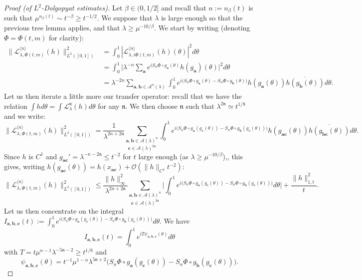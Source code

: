 \documentclass[10pt,a4paper]{amsart}
\begin{document}
\begin{proof}[Proof (of $L^2$-Dolgopyat estimates)]
Let $\beta \in (0,1/2]$ and recall that $n := n_\beta(t)$ is such that $\mu^{n_\beta(t)} \sim t^{-\beta} \geq t^{-1/2}$. We suppose that $\lambda$ is large enough so that the previous tree lemma applies, and that $\lambda \geq \mu^{-10/\beta}.$ We start by writing (denoting $\Phi = \Phi(t,m)$ for clarity):
\begin{align*} 
\Big\| \mathcal{L}_{\lambda,\Phi(t,m)}^{\langle n \rangle}(h) \Big\|_{L^2([0,1])}^2 &= \int_0^1 |\mathcal{L}_{\lambda,i\Phi(t,m)}^{\langle n \rangle}(h)(\theta)|^2 d\theta \\
& = \int_0^1 \Big| \lambda^{-n} \sum_{\mathbf{a}} e^{i S_n \Phi \circ g_{\mathbf{a}}(\theta)} h(g_\mathbf{a})(\theta) \Big|^2 d\theta \\
& = \lambda^{-2n} \sum_{\mathbf{a},\mathbf{b} \in \mathcal{A}^n(\lambda)} \int_0^1 e^{i \big( S_n \Phi \circ g_\mathbf{a}(\theta) - S_n \Phi \circ g_\mathbf{b}(\theta) \big)} h(g_\mathbf{a}(\theta)) \overline{h(g_\mathbf{b}(\theta))} d\theta.
\end{align*}
Let us then iterate a little more our transfer operator: recall that we have the relation $\int h d\theta = \int \mathcal{L}_\lambda^{\mathfrak{n}}(h) d\theta$ for any $\mathfrak{n}$. We then choose $\mathfrak{n}$ such that $\lambda^{2\mathfrak{n}} \simeq t^{1/8}$ and we write:
$$ \Big\| \mathcal{L}_{\lambda,\Phi(t,m)}^{\langle n \rangle}(h) \Big\|_{L^2([0,1])}^2 = \frac{1}{\lambda^{2n+2 \mathfrak{n}}} \underset{\mathbf{c} \in \mathcal{A}(\lambda)^{2\mathfrak{n}}}{\sum_{\mathbf{a},\mathbf{b} \in \mathcal{A}(\lambda)^n}} \int_0^1 e^{i \big( S_n \Phi \circ g_\mathbf{a}(g_\mathbf{c}(\theta)) - S_n \Phi \circ g_\mathbf{b}(g_\mathbf{c}(\theta)) \big)} h(g_\mathbf{ac}(\theta)) \overline{h(g_\mathbf{bc}(\theta))} d\theta. $$
Since $h$ is $C^1$ and $g_{\mathbf{ac}}' = \lambda^{-n-2\mathfrak{n}} \leq t^{-2}$ for $t$ large enough (as $\lambda \geq \mu^{-10/\beta}$),, this gives, writing $h(g_{\mathbf{ac}}(\theta)) = h(x_{\mathbf{ac}})+\mathcal{O}(\|h\|_{C^1} t^{-2})$:
$$ \Big\| \mathcal{L}_{\lambda,\Phi(t,m)}^{\langle n \rangle}(h) \Big\|_{L^2([0,1])}^2 \leq \frac{\|h\|_\infty^2}{\lambda^{2n+2\mathfrak{n}}} \underset{\mathbf{c} \in \mathcal{A}(\lambda)^{2\mathfrak{n}}}{\sum_{\mathbf{a},\mathbf{b} \in \mathcal{A}(\lambda)^n}} \Big| \int_0^1 e^{i \big( S_n \Phi \circ g_\mathbf{a}(g_\mathbf{c}(\theta)) - S_n \Phi \circ g_\mathbf{b}(g_\mathbf{c}(\theta)) \big)}  d\theta \Big| + \frac{\|h\|_{{1,t}}^2}{t} .$$
Let us then concentrate on the integral $I_{\mathbf{a},\mathbf{b},\mathbf{c}}(t) := \int_0^1 e^{i \big( S_n \Phi \circ g_\mathbf{a}(g_\mathbf{c}(\theta)) - S_n \Phi \circ g_\mathbf{b}(g_\mathbf{c}(\theta)) \big)}  d\theta$. We have
$$ I_{\mathbf{a},\mathbf{b},\mathbf{c}}(t) =  \int_0^1 e^{i T \psi_{\mathbf{a},\mathbf{b},\mathbf{c}}(\theta)}  d\theta $$
with $T=t \mu^{n-1} \lambda^{-5\mathfrak{n}-2} \geq t^{1/8}$ and 
$$\psi_{\mathbf{a},\mathbf{b},\mathbf{c}}(\theta) = t^{-1} \mu^{1-n} \lambda^{5\mathfrak{n}+2} \big( S_n \Phi \circ g_\mathbf{a}(g_\mathbf{c}(\theta)) - S_n \Phi \circ g_\mathbf{b}(g_\mathbf{c}(\theta)) \big).$$


\end{proof}
\end{document}
